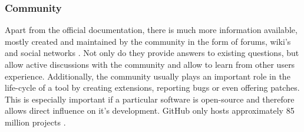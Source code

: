 
\subsubsection{Community}

Apart from the official documentation, there is much more information available, mostly created and maintained by the community in the form of forums, wiki's and social networks \cite{delaet2010survey}. Not only do they provide answers to existing questions, but allow active discussions with the community and allow to learn from other users experience. Additionally, the community usually plays an important role in the life-cycle of a tool by creating extensions, reporting bugs or even offering patches. This is especially important if a particular software is open-source and therefore allows direct influence on it's development. GitHub only hosts approximately 85 million projects \cite{githubabout}.


